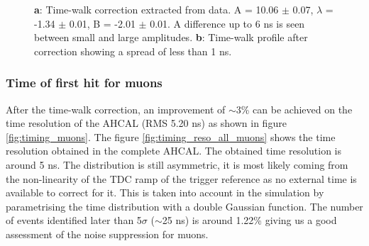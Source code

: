 \begin{figure}[htbp]
	\hfill
	\caption[]{\textbf{a}: Time-walk correction extracted from data. A = 10.06 $\pm$ 0.07, $\lambda$ = -1.34 $\pm$ 0.01, B = -2.01 $\pm$ 0.01. A difference up to 6 ns is seen between small and large amplitudes. \textbf{b}: Time-walk profile after correction showing a spread of less than 1 ns.}
\end{figure}

\subsubsection{Time of first hit for muons}
\label{subsec:Muon_final}

After the time-walk correction, an improvement of $\sim$3\% can be achieved on the time resolution of the AHCAL (RMS 5.20 ns) as shown in figure \ref{fig:timing_muons}. The figure \ref{fig:timing_reso_all_muons} shows the time resolution obtained in the complete AHCAL. The obtained time resolution is around 5 ns. The distribution is still asymmetric, it is most likely coming from the non-linearity of the TDC ramp of the trigger reference as no external time is available to correct for it. This is taken into account in the simulation by parametrising the time distribution with a double Gaussian function. The number of events identified later than 5$\sigma$ ($\sim$25 ns) is around 1.22\% giving us a good assessment of the noise suppression for muons.


